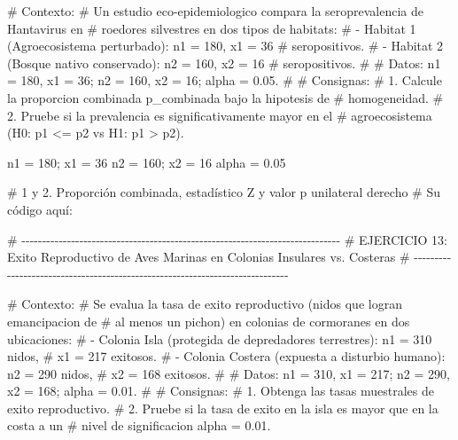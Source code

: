 \documentclass[
  spanish,
  letterpaper,
  DIV=11,
  numbers=noendperiod]{scrreprt}
\newenvironment{Shaded}{\begin{snugshade}}{\end{snugshade}}
\newcommand{\CommentTok}[1]{\textcolor[rgb]{0.37,0.37,0.37}{#1}}
\newcommand{\DecValTok}[1]{\textcolor[rgb]{0.68,0.00,0.00}{#1}}
\newcommand{\FloatTok}[1]{\textcolor[rgb]{0.68,0.00,0.00}{#1}}
\newcommand{\NormalTok}[1]{\textcolor[rgb]{0.00,0.23,0.31}{#1}}
\newcommand{\OtherTok}[1]{\textcolor[rgb]{0.00,0.23,0.31}{#1}}
\begin{document}
\begin{Shaded}
\begin{Highlighting}[]
\CommentTok{\# Contexto:}
\CommentTok{\# Un estudio eco{-}epidemiologico compara la seroprevalencia de Hantavirus en}
\CommentTok{\# roedores silvestres en dos tipos de habitats:}
\CommentTok{\#   {-} Habitat 1 (Agroecosistema perturbado): n1 = 180, x1 = 36}
\CommentTok{\#     seropositivos.}
\CommentTok{\#   {-} Habitat 2 (Bosque nativo conservado): n2 = 160, x2 = 16}
\CommentTok{\#     seropositivos.}
\CommentTok{\#}
\CommentTok{\# Datos: n1 = 180, x1 = 36; n2 = 160, x2 = 16; alpha = 0.05.}
\CommentTok{\#}
\CommentTok{\# Consignas:}
\CommentTok{\# 1. Calcule la proporcion combinada p\_combinada bajo la hipotesis de}
\CommentTok{\#    homogeneidad.}
\CommentTok{\# 2. Pruebe si la prevalencia es significativamente mayor en el}
\CommentTok{\#    agroecosistema (H0: p1 \textless{}= p2 vs H1: p1 \textgreater{} p2).}

\NormalTok{n1 }\OtherTok{=} \DecValTok{180}\NormalTok{; x1 }\OtherTok{=} \DecValTok{36}
\NormalTok{n2 }\OtherTok{=} \DecValTok{160}\NormalTok{; x2 }\OtherTok{=} \DecValTok{16}
\NormalTok{alpha }\OtherTok{=} \FloatTok{0.05}

\CommentTok{\# 1 y 2. Proporción combinada, estadístico Z y valor p unilateral derecho}
\CommentTok{\# Su código aquí:}



\CommentTok{\# {-}{-}{-}{-}{-}{-}{-}{-}{-}{-}{-}{-}{-}{-}{-}{-}{-}{-}{-}{-}{-}{-}{-}{-}{-}{-}{-}{-}{-}{-}{-}{-}{-}{-}{-}{-}{-}{-}{-}{-}{-}{-}{-}{-}{-}{-}{-}{-}{-}{-}{-}{-}{-}{-}{-}{-}{-}{-}{-}{-}{-}{-}{-}{-}{-}{-}{-}{-}{-}{-}{-}{-}{-}{-}{-}{-}{-}}
\CommentTok{\# EJERCICIO 13: Exito Reproductivo de Aves Marinas en Colonias Insulares vs. Costeras}
\CommentTok{\# {-}{-}{-}{-}{-}{-}{-}{-}{-}{-}{-}{-}{-}{-}{-}{-}{-}{-}{-}{-}{-}{-}{-}{-}{-}{-}{-}{-}{-}{-}{-}{-}{-}{-}{-}{-}{-}{-}{-}{-}{-}{-}{-}{-}{-}{-}{-}{-}{-}{-}{-}{-}{-}{-}{-}{-}{-}{-}{-}{-}{-}{-}{-}{-}{-}{-}{-}{-}{-}{-}{-}{-}{-}{-}{-}{-}{-}}

\CommentTok{\# Contexto:}
\CommentTok{\# Se evalua la tasa de exito reproductivo (nidos que logran emancipacion de}
\CommentTok{\# al menos un pichon) en colonias de cormoranes en dos ubicaciones:}
\CommentTok{\#   {-} Colonia Isla (protegida de depredadores terrestres): n1 = 310 nidos,}
\CommentTok{\#     x1 = 217 exitosos.}
\CommentTok{\#   {-} Colonia Costera (expuesta a disturbio humano): n2 = 290 nidos,}
\CommentTok{\#     x2 = 168 exitosos.}
\CommentTok{\#}
\CommentTok{\# Datos: n1 = 310, x1 = 217; n2 = 290, x2 = 168; alpha = 0.01.}
\CommentTok{\#}
\CommentTok{\# Consignas:}
\CommentTok{\# 1. Obtenga las tasas muestrales de exito reproductivo.}
\CommentTok{\# 2. Pruebe si la tasa de exito en la isla es mayor que en la costa a un}
\CommentTok{\#    nivel de significacion alpha = 0.01.}


\end{Highlighting}
\end{Shaded}
\end{document}
